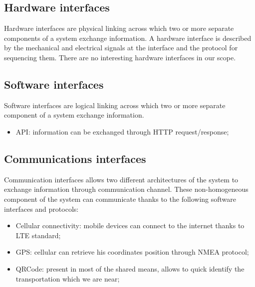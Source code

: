 \subsection{Hardware interfaces}
Hardware interfaces are physical linking across which two or more separate components of a system exchange information. A hardware interface is described by the mechanical and electrical signals at the interface and the protocol for sequencing them. There are no interesting hardware interfaces in our scope.

\subsection{Software interfaces}
Software interfaces are logical linking across which two or more separate component of a system exchange information. 
\begin{itemize}
\item API: information can be exchanged through HTTP request/response;
\end{itemize}

\subsection{Communications interfaces}
Communication interfaces allows two different architectures of the system to exchange information through communication channel. These non-homogeneous component of the system can communicate thanks to the following software interfaces and protocols:
\begin{itemize}
\item Cellular connectivity: mobile devices can connect to the internet thanks to LTE standard;
\item GPS: cellular can retrieve his coordinates position through NMEA protocol;
\item QRCode: present in most of the shared means, allows to quick identify the transportation which we are near;
\end{itemize}